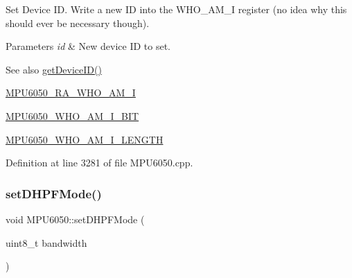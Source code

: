 Set Device ID. Write a new ID into the W\+H\+O\+\_\+\+A\+M\+\_\+I register (no idea why this should ever be necessary though). 
\begin{DoxyParams}{Parameters}
{\em id} & New device ID to set. \\
\hline
\end{DoxyParams}
\begin{DoxySeeAlso}{See also}
\mbox{\hyperlink{classMPU6050_a35ae3c8894b3258e642043886801e031}{get\+Device\+I\+D()}} 

\mbox{\hyperlink{MPU6050_8h_a83d60aa4c37e954266ecd17ae02ec174}{M\+P\+U6050\+\_\+\+R\+A\+\_\+\+W\+H\+O\+\_\+\+A\+M\+\_\+I}} 

\mbox{\hyperlink{MPU6050_8h_a3c136677cedb8e974669e70018326ea1}{M\+P\+U6050\+\_\+\+W\+H\+O\+\_\+\+A\+M\+\_\+\+I\+\_\+\+B\+IT}} 

\mbox{\hyperlink{MPU6050_8h_ab07bf191f71bdb7f5edcd2b41f6c0709}{M\+P\+U6050\+\_\+\+W\+H\+O\+\_\+\+A\+M\+\_\+\+I\+\_\+\+L\+E\+N\+G\+TH}} 
\end{DoxySeeAlso}


Definition at line 3281 of file M\+P\+U6050.\+cpp.


\begin{DoxyCode}{0}

\end{DoxyCode}
\mbox{\label{classMPU6050_a44cc43aaad1e52c1ba3142d4490af611}} 
\subsubsection{\texorpdfstring{setDHPFMode()}{setDHPFMode()}}
{\footnotesize\ttfamily void M\+P\+U6050\+::set\+D\+H\+P\+F\+Mode (\begin{DoxyParamCaption}\item[{uint8\+\_\+t}]{bandwidth }\end{DoxyParamCaption})}

